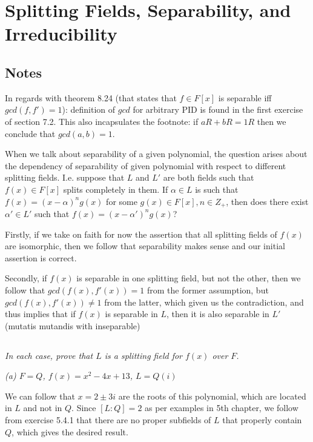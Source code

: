 \documentclass[11pt,oneside,titlepage]{book}
\begin{document}
\section{Splitting Fields, Separability, and Irreducibility}

\subsection*{Notes}

In regards with theorem 8.24 (that states that $f \in F[x]$ is
separable iff $gcd(f, f') = 1$): definition of $gcd$ for arbitrary PID is
found in the first exercise of section 7.2. This also incapsulates the
footnote: if $aR + bR = 1R$ then we conclude that $gcd(a, b) = 1$.

When we talk about separability of a given polynomial, the question
arises about the dependency of separability of given polynomial with
respect to different splitting fields. I.e. suppose that $L$ and $L'$
are both fields such that $f(x) \in F[x]$ splits completely in them.
If $\alpha \in L$ is such that $f(x) = (x - \alpha)^n g(x)$ for some
$g(x) \in F[x], n \in Z_+$, then does there exist $\alpha' \in L'$ such that
$f(x) = (x - \alpha')^ng(x)$?

Firstly, if we take on faith for now the assertion that all
splitting fields of $f(x)$ are isomorphic, then we follow that
separability makes sense and our initial assertion is correct.

Secondly, if $f(x)$ is separable in one splitting field, but not the
other, then we follow that $gcd(f(x), f'(x)) = 1$ from the former
assumption, but $gcd(f(x), f'(x)) \neq 1$ from the latter, which given
us the contradiction, and thus implies that if $f(x)$ is separable in
$L$, then it is also separable in $L'$ (mutatis mutandis with
inseparable)

\subsection{}

\textit{In each case, prove that $L$ is a splitting field for $f(x)$ over $F$.}

\textit{(a) $F = Q$, $f(x) = x^2 - 4x + 13$, $L = Q(i)$}

We can follow that $x = 2 \pm 3i$ are the roots of this polynomial,
which are located in $L$ and not in $Q$. Since $[L:Q] = 2$ as per
examples in 5th chapter, we follow from exercise 5.4.1 that there are
no proper subfields of $L$ that properly contain $Q$, which gives the
desired result.
\end{document}
